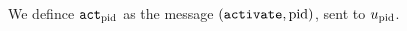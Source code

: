 \begin{definition}
  We defince $\mathtt{act}_{\mathrm{pid}}$ as the message $\left(\mathtt{activate},
  \mathrm{pid}\right)$, sent to $u_{\mathrm{pid}}$.
\end{definition}
